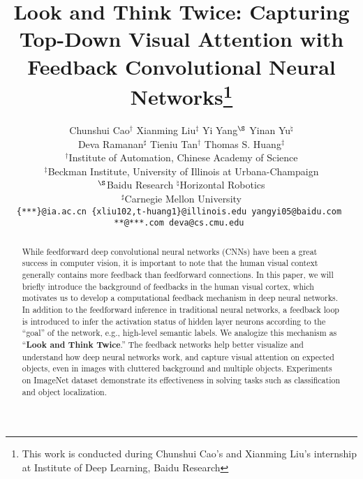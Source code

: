 \documentclass[10pt,twocolumn,letterpaper]{article}
\begin{document}
\title{Look and Think Twice: Capturing Top-Down Visual Attention with Feedback Convolutional Neural Networks\thanks{This work is conducted during Chunshui Cao's and Xianming Liu's internship at Institute of Deep Learning, Baidu Research }}


\author{Chunshui Cao$^\dag$ \;\; Xianming Liu$^\ddag$ \;\; Yi Yang$^\S$ \;\; Yinan Yu$^\natural$ \;\; \\
Deva Ramanan$^\sharp$ \;\; Tieniu Tan$^\dag$ \;\; Thomas S. Huang$^\ddag$ \\
$^\dag$Institute of Automation, Chinese Academy of Science\\
$^\ddag$Beckman Institute, University of Illinois at Urbana-Champaign\\
$^\S$Baidu Research \quad $^\natural$Horizontal Robotics\\
$^\sharp$Carnegie Mellon University \\
{\tt \small \{***\}@ia.ac.cn \;\; \{xliu102,t-huang1\}@illinois.edu \;\; yangyi05@baidu.com \;\;}\\
{\tt \small ***@***.com \;\; deva@cs.cmu.edu }
}

\maketitle


\begin{abstract}
While feedforward deep convolutional neural networks (CNNs) have been a great success in computer vision, it is important to note that the human visual context generally contains more feedback than feedforward connections.
In this paper, we will briefly introduce the background of feedbacks in the human visual cortex, which motivates us to develop a computational feedback mechanism in deep neural networks.
In addition to the feedforward inference in traditional neural networks, a feedback loop is introduced to infer the activation status of hidden layer neurons according to the ``goal'' of the network, e.g., high-level semantic labels.
We analogize this mechanism as ``\textbf{Look and Think Twice}.''
The feedback networks help better visualize and understand how deep neural networks work, and capture visual attention on expected objects, even in images with cluttered background and multiple objects.
Experiments on ImageNet dataset demonstrate its effectiveness in solving tasks such as classification and object localization.
\end{abstract}







{\small


}
\end{document}
